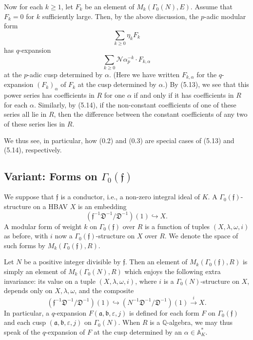 \documentclass[12pt,a4paper]{article}
\theoremstyle{plain}
\theoremstyle{definition}
\theoremstyle{remark}
\begin{document}
Now for each $k \ge 1$, let $F_k$ be an element of $M_k(\Gamma_0(N), E)$. Assume that $F_k = 0$ for $k$ sufficiently large. Then, by the above discussion, the $p$-adic modular form
\[
\sum_{k \ge 0} \eta_k F_k
\]
has $q$-expansion
\[
\sum_{k \ge 0} \mathcal{N}\alpha_p^{-k} \cdot F_{k,\alpha}
\]
at the $p$-adic cusp determined by $\alpha$. (Here we have written $F_{k,\alpha}$ for the $q$-expansion $(F_k)_\alpha$ of $F_k$ at the cusp determined by $\alpha$.) By (5.13), we see that this power series has coefficients in $R$ for one $\alpha$ if and only if it has coefficients in $R$ for each $\alpha$. Similarly, by (5.14), if the non-constant coefficients of one of these series all lie in $R$, then the difference between the constant coefficients of any two of these series lies in $R$.

We thus see, in particular, how (0.2) and (0.3) are special cases of (5.13) and (5.14), respectively.

\subsection*{Variant: Forms on $\Gamma_0(\mathfrak{f})$}

We suppose that $\mathfrak{f}$ is a conductor, i.e., a non-zero integral ideal of $K$. A $\Gamma_0(\mathfrak{f})$-structure on a HBAV $X$ is an embedding
\[
(\mathfrak{f}^{-1}\mathfrak{D}^{-1}/\mathfrak{D}^{-1})(1) \hookrightarrow X.
\]
A modular form of weight $k$ on $\Gamma_0(\mathfrak{f})$ over $R$ is a function of tuples $(X, \lambda, \omega, i)$ as before, with $i$ now a $\Gamma_0(\mathfrak{f})$-structure on $X$ over $R$. We denote the space of such forms by $M_k(\Gamma_0(\mathfrak{f}), R)$.

Let $N$ be a positive integer divisible by $\mathfrak{f}$. Then an element of $M_k(\Gamma_0(\mathfrak{f}), R)$ is simply an element of $M_k(\Gamma_0(N), R)$ which enjoys the following extra invariance: its value on a tuple $(X, \lambda, \omega, i)$, where $i$ is a $\Gamma_0(N)$-structure on $X$, depends only on $X, \lambda, \omega$, and the composite
\[
(\mathfrak{f}^{-1}\mathfrak{D}^{-1}/\mathfrak{D}^{-1})(1) \hookrightarrow (N^{-1}\mathfrak{D}^{-1}/\mathfrak{D}^{-1})(1) \xrightarrow{i} X.
\]
In particular, a $q$-expansion $F(\mathfrak{a}, \mathfrak{b}, \varepsilon, j)$ is defined for each form $F$ on $\Gamma_0(\mathfrak{f})$ and each cusp $(\mathfrak{a}, \mathfrak{b}, \varepsilon, j)$ on $\Gamma_0(N)$. When $R$ is a $\mathbb{Q}$-algebra, we may thus speak of the $q$-expansion of $F$ at the cusp determined by an $\alpha \in \mathbb{A}_K^*$.
\end{document}
